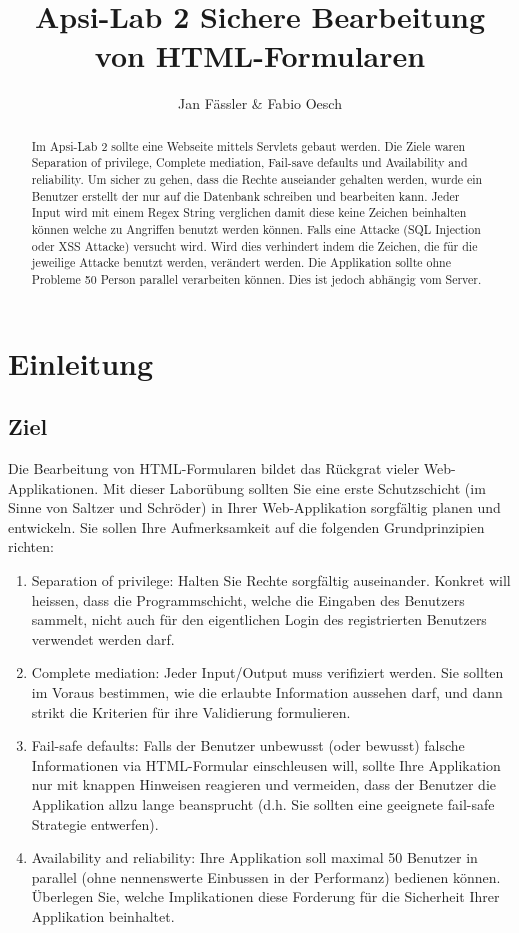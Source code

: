 \documentclass[10pt]{article}
\title{ %
Apsi-Lab 2
\vspace{0.2cm}
\Large Sichere Bearbeitung von HTML-Formularen}
\author{Jan Fässler \& Fabio Oesch}
\begin{document}
\maketitle
\thispagestyle{firststyle}
\pagestyle{firststyle}
\begin{abstract}
\begin{center}
Im Apsi-Lab 2 sollte eine Webseite mittels Servlets gebaut werden. Die Ziele waren Separation of privilege, Complete mediation, Fail-save defaults und Availability and reliability. Um sicher zu gehen, dass die Rechte auseiander gehalten werden, wurde ein Benutzer erstellt der nur auf die Datenbank schreiben und bearbeiten kann. Jeder Input wird mit einem Regex String verglichen damit diese keine Zeichen beinhalten können welche zu Angriffen benutzt werden können. Falls eine Attacke (SQL Injection oder XSS Attacke) versucht wird. Wird dies verhindert indem die Zeichen, die für die jeweilige Attacke benutzt werden, verändert werden. Die Applikation sollte ohne Probleme 50 Person parallel verarbeiten können. Dies ist jedoch abhängig vom Server.
\end{center}
\vspace{0.5cm}
\hrulefill
\end{abstract}

\pagestyle{documentstyle}
\tableofcontents
\pagebreak
\section{Einleitung}
\subsection{Ziel}
Die Bearbeitung von HTML-Formularen bildet das Rückgrat vieler Web-Applikationen. Mit
dieser Laborübung sollten Sie eine erste Schutzschicht (im Sinne von Saltzer und Schröder)
in Ihrer Web-Applikation sorgfältig planen und entwickeln. Sie sollen Ihre Aufmerksamkeit
auf die folgenden Grundprinzipien richten:
\begin{enumerate}
 \item  Separation of privilege: Halten Sie Rechte sorgfältig auseinander. Konkret will heissen, dass die Programmschicht, welche die Eingaben des Benutzers sammelt, nicht auch für den eigentlichen Login des registrierten Benutzers verwendet werden darf.
 \item  Complete mediation: Jeder Input/Output muss verifiziert werden. Sie sollten im Voraus bestimmen, wie die erlaubte Information aussehen darf, und dann strikt die Kriterien für ihre Validierung formulieren.
 \item  Fail-safe defaults: Falls der Benutzer unbewusst (oder bewusst) falsche Informationen via HTML-Formular einschleusen will, sollte Ihre Applikation nur mit knappen Hinweisen reagieren und vermeiden, dass der Benutzer die Applikation allzu lange beansprucht (d.h. Sie sollten eine geeignete fail-safe Strategie entwerfen).
 \item  Availability and reliability: Ihre Applikation soll maximal 50 Benutzer in parallel (ohne nennenswerte Einbussen in der Performanz) bedienen können. Überlegen Sie, welche Implikationen diese Forderung für die Sicherheit Ihrer Applikation beinhaltet.
\end{enumerate}
\end{document}
